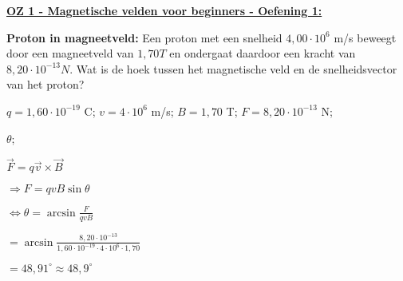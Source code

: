 \textbf{\underline{OZ 1 - Magnetische velden voor beginners - Oefening 1:}}
\vspace{0.5cm}

\textbf{Proton in magneetveld:} Een proton met een snelheid $ 4,00 \cdot 10^{6} $ m/s beweegt door een magneetveld van $ 1,70 T $ en ondergaat daardoor een kracht van $ 8,20 \cdot 10^{-13} N $. Wat is de hoek tussen het magnetische veld en de snelheidsvector van het proton?

\begin{description}[labelwidth=1.5cm, leftmargin=!]
    \item[Geg. :]   $ q = 1,60 \cdot 10^{-19} $ C; $ v = 4 \cdot 10^{6} $ m/s; $ B = 1,70 $ T; $ F = 8,20 \cdot 10^{-13} $ N;
    \item[Gevr. :]  $ \theta $;
    \item[Opl. :]   $ \vec{F} = q \vec{v} \times \vec{B} $
    
                    \hspace{-0.58cm} $ \Rightarrow
                    F = q v B \sin{\theta} $
    
                    \hspace{-0.58cm} $ \Leftrightarrow
                    \theta = \arcsin{\frac{F}{q v B}} $
                    
                    \hspace{0.12cm} $
                    = \arcsin{\frac{8,20 \cdot 10^{-13}}{1,60 \cdot 10^{-19} \cdot 4 \cdot 10^6 \cdot 1,70}} $
                    
                    \hspace{0.12cm} $
                    = 48,91^{\circ} \approx 48,9^{\circ} $
\end{description}

\vspace{1cm}